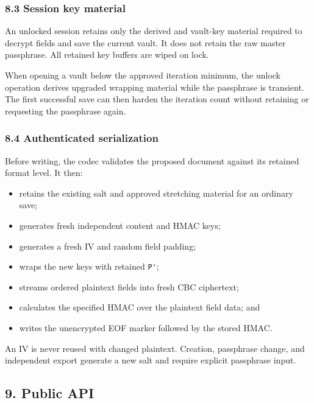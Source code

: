 \documentclass[
  letterpaper,
]{article}
\newcommand{\passthrough}[1]{#1}
\providecommand{\tightlist}{%
  \setlength{\itemsep}{0pt}\setlength{\parskip}{0pt}}
\begin{document}
\subsubsection{8.3 Session key material}\label{83-session-key-material}

An unlocked session retains only the derived and vault-key material required to decrypt fields and save the current
vault. It does not retain the raw master passphrase. All retained key buffers are wiped on lock.

When opening a vault below the approved iteration minimum, the unlock operation derives upgraded wrapping material while
the passphrase is transient. The first successful save can then harden the iteration count without retaining or
requesting the passphrase again.

\subsubsection{8.4 Authenticated serialization}\label{84-authenticated-serialization}

Before writing, the codec validates the proposed document against its retained format level. It then:

\begin{itemize}
\tightlist
\item
  retains the existing salt and approved stretching material for an ordinary save;
\item
  generates fresh independent content and HMAC keys;
\item
  generates a fresh IV and random field padding;
\item
  wraps the new keys with retained \passthrough{\lstinline!P'!};
\item
  streams ordered plaintext fields into fresh CBC ciphertext;
\item
  calculates the specified HMAC over the plaintext field data; and
\item
  writes the unencrypted EOF marker followed by the stored HMAC.
\end{itemize}

An IV is never reused with changed plaintext. Creation, passphrase change, and independent export generate a new salt
and require explicit passphrase input.

\subsection{9. Public API}\label{9-public-api}
\end{document}
